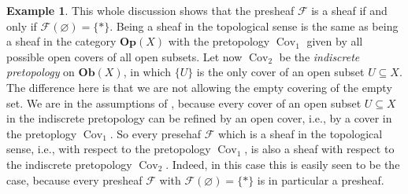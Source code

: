 \documentclass[12pt,a4paper]{amsart}
\theoremstyle{plain}
\theoremstyle{definition}
\newtheorem{exmp}[thm]{Example}
\theoremstyle{remark}
\begin{document}
\begin{exmp}
  This whole discussion shows that the presheaf $\mathscr{F}$ is a sheaf if and only if $\mathscr{F}(\varnothing) = \{ * \}$.
  Being a sheaf in the topological sense is the same as being a sheaf in the category $\mathbf{Op}(X)$ with the pretopology $\operatorname{Cov}_{1}$ given by all possible open covers of all open subsets.
  Let now $\operatorname{Cov}_{2}$ be the \textit{indiscrete pretopology} on $\mathbf{Ob}(X)$,
  in which $\{ U \}$ is the only cover of an open subset $U \subseteq X$.
  The difference here is that we are not allowing the empty covering of the empty set.
  We are in the assumptions of , because every cover of an open subset $U \subseteq X$ in the indiscrete pretopology can be refined by an open cover, i.e., by a cover in the pretoplogy $\operatorname{Cov}_{1}$.
  So every presehaf $\mathscr{F}$ which is a sheaf in the topological sense, i.e., with respect to the pretopology $\operatorname{Cov}_{1}$, is also a sheaf with respect to the indiscrete pretopology $\operatorname{Cov}_{2}$.
  Indeed, in this case this is easily seen to be the case, because every presheaf $\mathscr{F}$ with $\mathscr{F}(\varnothing) = \{ * \}$ is in particular a presheaf.
\end{exmp}
\end{document}
